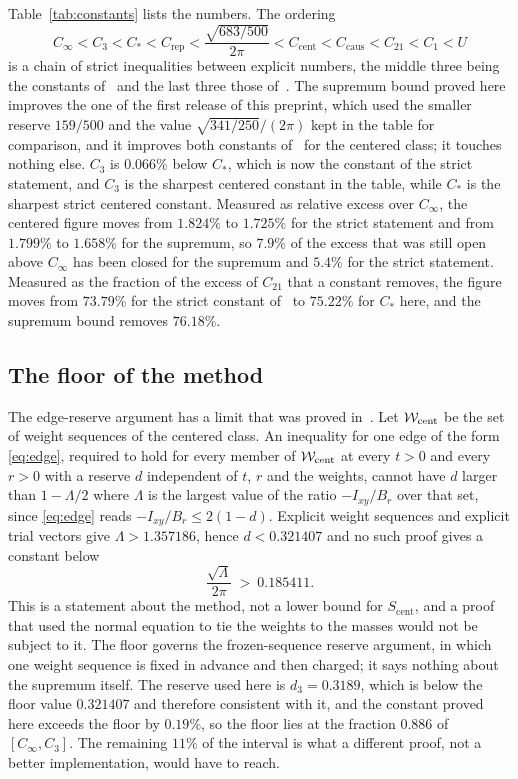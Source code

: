 \documentclass[10pt]{article}
\theoremstyle{remark}
\newcommand{\Cinf}{C_\infty}
\newcommand{\Ccent}{C_{\mathrm{cent}}}
\newcommand{\Ccaus}{C_{\mathrm{caus}}}
\newcommand{\Cstar}{C_{*}}
\newcommand{\Cthree}{C_{3}}
\newcommand{\Crep}{C_{\mathrm{rep}}}
\newcommand{\dthree}{d_{3}}
\begin{document}
Table~\ref{tab:constants} lists the numbers. The ordering
\[
\Cinf<\Cthree<\Cstar<\Crep<\frac{\sqrt{683/500}}{2\pi}<\Ccent<\Ccaus<C_{21}<C_1<U
\]
is a chain of strict inequalities between explicit numbers, the middle three being the constants of~\cite{finiteenergy} and the last three those of~\cite{optimum,predecessor}. The supremum bound proved here improves the one of the first release of this preprint, which used the smaller reserve $159/500$ and the value $\sqrt{341/250}/(2\pi)$ kept in the table for comparison, and it improves both constants of~\cite{finiteenergy} for the centered class; it touches nothing else. $\Cthree$ is $0.066\%$ below $\Cstar$, which is now the constant of the strict statement, and $\Cthree$ is the sharpest centered constant in the table, while $\Cstar$ is the sharpest strict centered constant. Measured as relative excess over $\Cinf$, the centered figure moves from $1.824\%$ to $1.725\%$ for the strict statement and from $1.799\%$ to $1.658\%$ for the supremum, so $7.9\%$ of the excess that was still open above $\Cinf$ has been closed for the supremum and $5.4\%$ for the strict statement. Measured as the fraction of the excess of $C_{21}$ that a constant removes, the figure moves from $73.79\%$ for the strict constant of~\cite{finiteenergy} to $75.22\%$ for $\Cstar$ here, and the supremum bound removes $76.18\%$.

\subsection{The floor of the method}

The edge-reserve argument has a limit that was proved in~\cite{finiteenergy}. Let $\mathcal W_{\rm cent}$ be the set of weight sequences of the centered class. An inequality for one edge of the form \eqref{eq:edge}, required to hold for every member of $\mathcal W_{\rm cent}$ at every $t>0$ and every $r>0$ with a reserve $d$ independent of $t$, $r$ and the weights, cannot have $d$ larger than $1-\Lambda/2$ where $\Lambda$ is the largest value of the ratio $-I_{xy}/B_r$ over that set, since \eqref{eq:edge} reads $-I_{xy}/B_r\le2(1-d)$. Explicit weight sequences and explicit trial vectors give $\Lambda>1.357186$, hence $d<0.321407$ and no such proof gives a constant below
\[
\frac{\sqrt{\Lambda}}{2\pi}\ >\ 0.185411 .
\]
This is a statement about the method, not a lower bound for $S_{\mathrm{cent}}$, and a proof that used the normal equation to tie the weights to the masses would not be subject to it. The floor governs the frozen-sequence reserve argument, in which one weight sequence is fixed in advance and then charged; it says nothing about the supremum itself. The reserve used here is $\dthree=0.3189$, which is below the floor value $0.321407$ and therefore consistent with it, and the constant proved here exceeds the floor by $0.19\%$, so the floor lies at the fraction $0.886$ of $[\Cinf,\Cthree]$. The remaining $11\%$ of the interval is what a different proof, not a better implementation, would have to reach.
\end{document}

